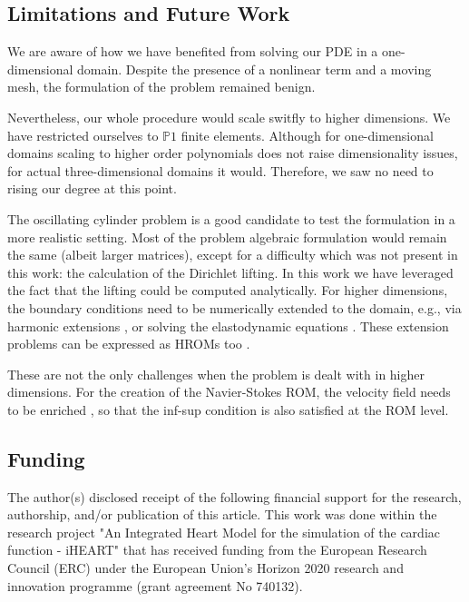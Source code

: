 \documentclass[thesis.tex]{subfiles}
\begin{document}
\subsection{Limitations and Future Work}
We are aware of how we have benefited from solving our PDE in a one-dimensional domain.
Despite the presence of a nonlinear term and a moving mesh,
the formulation of the problem remained benign. 

Nevertheless, our whole procedure would scale switfly to higher dimensions.
We have restricted ourselves to $\mathbb{P}1$ finite elements.
Although for one-dimensional domains scaling to higher order polynomials does not
raise dimensionality issues, for actual three-dimensional domains it would.
Therefore, we saw no need to rising our degree at this point.

The oscillating cylinder problem is a good candidate 
to test the formulation in a more realistic setting.
Most of the problem algebraic formulation would remain the same (albeit larger matrices),
except for a difficulty which was not present in this work: 
the calculation of the Dirichlet lifting. 
In this work we have leveraged the fact that the lifting could be computed analytically.
For higher dimensions, the boundary conditions need to be numerically extended to the domain, 
e.g., via harmonic extensions
\cite{formaggiaALE},
or solving the elastodynamic equations
\cite{1995_farhat_elasticEquations}.
These extension problems can be expressed as HROMs too \cite{Santo_Manzoni_2019}.

These are not the only challenges when the problem is dealt with in higher dimensions.
For the creation of the Navier-Stokes ROM, the velocity field needs to be enriched
\cite{supremizers},
so that the inf-sup condition is also satisfied at the ROM level.

\newpage
\subsection*{Funding}
The author(s) disclosed receipt of the following financial support for the research, 
authorship, and/or publication of this article.
This work was done
within the research project 
"An Integrated Heart Model for the simulation of the cardiac function - iHEART" 
that has received funding from the European Research Council (ERC) 
under the European Union’s Horizon 2020 research and innovation programme 
(grant agreement No 740132).
\end{document}
